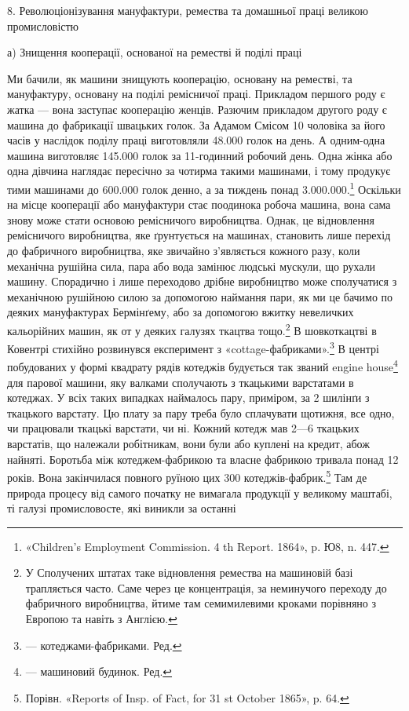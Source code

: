 8. Революціонізування мануфактури, ремества та домашньої
праці великою промисловістю

а) Знищення кооперації, основаної
на реместві й поділі праці

Ми бачили, як машини знищують кооперацію, основану на
реместві, та мануфактуру, основану на поділі ремісничої
праці. Прикладом першого роду є жатка — вона заступає кооперацію
женців. Разючим прикладом другого роду є машина до
фабрикації швацьких голок. За Адамом Смісом 10 чоловіка за
його часів у наслідок поділу праці виготовляли 48.000 голок на
день. А одним-одна машина виготовляє 145.000 голок за 11-годинний
робочий день. Одна жінка або одна дівчина наглядає
пересічно за чотирма такими машинами, і тому продукує тими
машинами до 600.000 голок денно, а за тиждень понад 3.000.000.\footnote{
«Children’s Employment Commission. 4 th Report. 1864», p. Ю8,
n. 447.
}
Оскільки на місце кооперації або мануфактури стає поодинока
робоча машина, вона сама знову може стати основою ремісничого
виробництва. Однак, це відновлення ремісничого виробництва,
яке ґрунтується на машинах, становить лише перехід до фабричного
виробництва, яке звичайно з’являється кожного разу, коли
механічна рушійна сила, пара або вода замінює людські мускули,
що рухали машину. Спорадично і лише переходово дрібне виробництво
може сполучатися з механічною рушійною силою за
допомогою наймання пари, як ми це бачимо по деяких мануфактурах
Бермінґему, або за допомогою вжитку невеличких кальорійних
машин, як от у деяких галузях ткацтва тощо.\footnote{
У Сполучених штатах таке відновлення ремества на машиновій
базі трапляється часто. Саме через це концентрація, за неминучого переходу
до фабричного виробництва, йтиме там семимилевими кроками порівняно
з Европою та навіть з Англією.
} В шовкоткацтві
в Ковентрі стихійно розвинувся експеримент з «cottage-фабриками».\footnote*{
— котеджами-фабриками. Ред.
}
В центрі побудованих у формі квадрату рядів котеджів
будується так званий engine house\footnote*{
— машиновий будинок. Ред.
} для парової машини,
яку валками сполучають з ткацькими варстатами в котеджах.
У всіх таких випадках наймалось пару, приміром, за 2 шилінґи
з ткацького варстату. Цю плату за пару треба було сплачувати
щотижня, все одно, чи працювали ткацькі варстати, чи ні. Кожний
котедж мав 2—6 ткацьких варстатів, що належали робітникам,
вони були або куплені на кредит, абож найняті. Боротьба між
котеджем-фабрикою та власне фабрикою тривала понад 12 років.
Вона закінчилася повного руїною цих 300 котеджів-фабрик.\footnote{
Порівн. «Reports of Insp. of Fact, for 31 st October 1865», p. 64.
} Там
де природа процесу від самого початку не вимагала продукції у великому
маштабі, ті галузі промисловосте, які виникли за останні